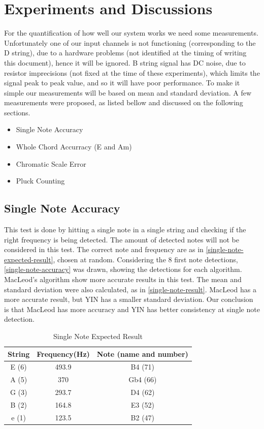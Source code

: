 \chapter{Experiments and Discussions}
For the quantification of how well our system works we need some measurements.
Unfortunately one of our input channels is not functioning (corresponding to the
D string), due to a hardware problems (not identified at the timing of writing this document),
hence it will be ignored. B string signal has DC noise,
due to resistor imprecisions (not fixed at the time of these experiments),
which limits the signal peak to peak value, and so it will have poor performance.
To make it simple our measurements will be based on mean and standard deviation.
A few measurements were proposed, as listed bellow and discussed on the following sections. 

\begin{itemize}
  \item Single Note Accuracy
  \item Whole Chord Accurracy (E and Am)
  \item Chromatic Scale Error
  \item Pluck Counting
\end{itemize}


\section{Single Note Accuracy}
This test is done by hitting a single note in a single string and checking if the right
frequency is being detected. The amount of detected notes will not be considered in this test.
The correct note and frequency are as in \autoref{single-note-expected-result}, chosen at random.
Considering the 8 first note detections, \autoref{single-note-accuracy} was drawn, showing
the detections for each algorithm. MacLeod's algorithm show more accurate results in this test.
The mean and standard deviation were also calculated, as in \autoref{single-note-result}.
MacLeod has a more accurate result, but YIN has a smaller standard deviation.
Our conclusion is that MacLeod has more accuracy and YIN has better consistency at single note
detection.

\begin{table}[htb]
  \begin{center}
    \ABNTEXreducedfont
    \caption[Single Note Expected Result]{Single Note Expected Result}
    \label{single-note-expected-result}
    \begin{tabular}{c | c | c}
      \hline
      String & Frequency(Hz) & Note (name and number)\\
      \hline \hline
      E (6) & 493.9 & B4 (71) \\ \hline
      A (5) & 370 & Gb4 (66) \\ \hline
      G (3) & 293.7 & D4 (62) \\ \hline
      B (2) & 164.8 & E3 (52) \\ \hline
      e (1) & 123.5 & B2 (47) \\ \hline
    \end{tabular}
  \end{center}
\end{table}

